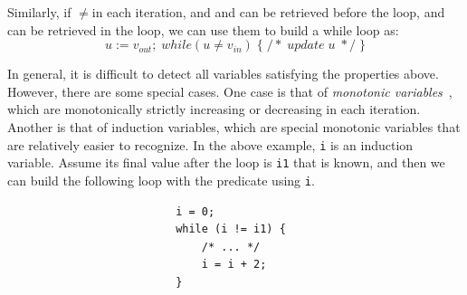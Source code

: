 \documentclass[12pt]{gatech-thesis}
\begin{document}
\begin{itemize}
Similarly, if \viter$\ne$\vinit  in each iteration, and  \vinit and \vfinal can be retrieved before the loop, and \vmu can be retrieved in the loop, we can use them to build a while loop as: 
$$
u := v_{out}; \; while (u \ne v_{in}) \;  \{\; /* \; update \; u \; */ \; \}
$$

In general, it is difficult to detect all variables satisfying the properties above.
However, there are some special cases.
One case is that of \emph{monotonic variables}~\cite{Wolfe1992}, which are monotonically strictly increasing or decreasing in each iteration.
Another is that of induction variables, which are special monotonic variables that are relatively easier to recognize. In the above example, \texttt{i} is an induction variable. Assume its final value after the loop is \texttt{i1} that is known, and then we can build the following loop with the predicate using \texttt{i}.



\small
\begin{verbatim}
                          i = 0;
                          while (i != i1) {
                              /* ... */
                              i = i + 2;
                          }
\end{verbatim}
\normalsize



\end{itemize}
\end{document}
